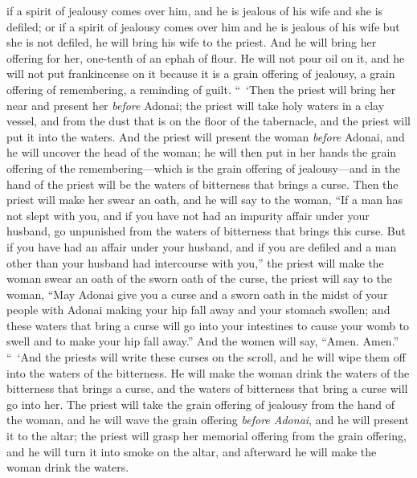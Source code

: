 \begin{biblechapter}
\verse if a spirit of jealousy comes over him, and he is jealous of his wife and she is defiled; or if a spirit of jealousy comes over him and he is jealous of his wife but she is not defiled,
\verse he will bring his wife to the priest. And he will bring her offering for her, one-tenth of an ephah of flour. He will not pour oil on it, and he will not put frankincense on it because it is a grain offering of jealousy, a grain offering of remembering, a reminding of guilt.
\verse “ ‘Then the priest will bring her near and present her \textit{before} Adonai;
\verse the priest will take holy waters in a clay vessel, and from the dust that is on the floor of the tabernacle, and the priest will put it into the waters.
\verse And the priest will present the woman \textit{before} Adonai, and he will uncover the head of the woman; he will then put in her hands the grain offering of the remembering—which is the grain offering of jealousy—and in the hand of the priest will be the waters of bitterness that brings a curse.
\verse Then the priest will make her swear an oath, and he will say to the woman, “If a man has not slept with you, and if you have not had an impurity affair under your husband, go unpunished from the waters of bitterness that brings this curse.
\verse But if you have had an affair under your husband, and if you are defiled and a man other than your husband had intercourse with you,”
\verse the priest will make the woman swear an oath of the sworn oath of the curse, the priest will say to the woman, “May Adonai give you a curse and a sworn oath in the midst of your people with Adonai making your hip fall away and your stomach swollen;
\verse and these waters that bring a curse will go into your intestines to cause your womb to swell and to make your hip fall away.” And the women will say, “Amen. Amen.”
\verse “ ‘And the priests will write these curses on the scroll, and he will wipe them off into the waters of the bitterness.
\verse He will make the woman drink the waters of the bitterness that brings a curse, and the waters of bitterness that bring a curse will go into her.
\verse The priest will take the grain offering of jealousy from the hand of the woman, and he will wave the grain offering \textit{before Adonai}, and he will present it to the altar;
\verse the priest will grasp her memorial offering from the grain offering, and he will turn it into smoke on the altar, and afterward he will make the woman drink the waters.

\end{biblechapter}
